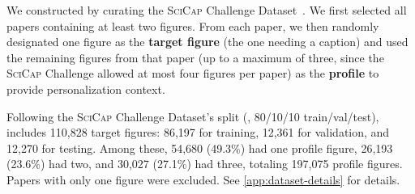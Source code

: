 We constructed \dataset by curating the \textsc{SciCap} Challenge Dataset~\cite{hsu2025large}.
We first selected all papers containing at least two figures. 
From each paper, we then randomly designated one figure as the \textbf{target figure} (the one needing a caption) and used the remaining figures from that paper (up to a maximum of three, since the \textsc{SciCap} Challenge allowed at most four figures per paper) as the \textbf{profile} to provide personalization context.

Following the \textsc{SciCap} Challenge Dataset's split (\ie, 80/10/10 train/val/test), \dataset includes 110,828 target figures: 
86,197 for training, 
12,361 for validation, and 
12,270 for testing. 
Among these, 54,680 (49.3\%) had one profile figure, 26,193 (23.6\%) had two, and 30,027 (27.1\%) had three, totaling 197,075 profile figures. 
Papers with only one figure were excluded. %
See \autoref{app:dataset-details} for details.

